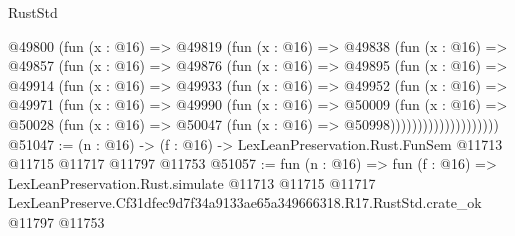 \begin{lexlean}{RustStd}
\begin{coremodule}
              @49800
                (fun (x : @16) =>
                @49819
                  (fun (x : @16) =>
                  @49838
                    (fun (x : @16) =>
                    @49857
                      (fun (x : @16) =>
                      @49876
                        (fun (x : @16) =>
                        @49895
                          (fun (x : @16) =>
                          @49914
                            (fun (x : @16) =>
                            @49933
                              (fun (x : @16) =>
                              @49952
                                (fun (x : @16) =>
                                @49971
                                  (fun (x : @16) =>
                                  @49990
                                    (fun (x : @16) =>
                                    @50009
                                      (fun (x : @16) =>
                                      @50028
                                        (fun (x : @16) =>
                                        @50047 (fun (x : @16) => @50998))))))))))))))))))))
@51047 := (n : @16) ->
  (f : @16) -> LexLeanPreservation.Rust.FunSem @11713 @11715 @11717 @11797 @11753
@51057 := fun (n : @16) =>
  fun (f : @16) =>
  LexLeanPreservation.Rust.simulate
    @11713
    @11715
    @11717
    LexLeanPreserve.Cf31dfec9d7f34a9133ae65a349666318.R17.RustStd.crate_ok
    @11797
    @11753
\end{coremodule}
\end{lexlean}
